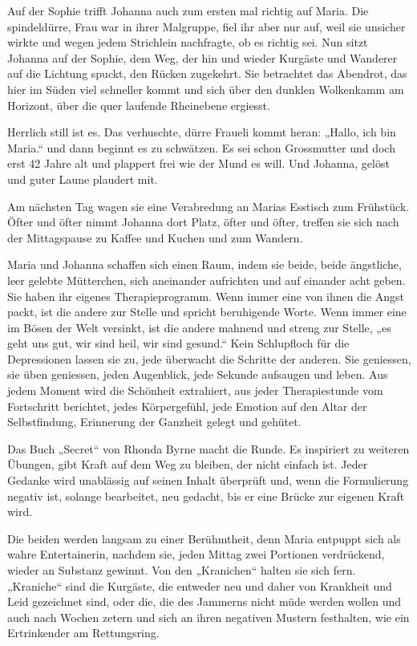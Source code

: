 \documentclass[10pt,titlepage,a5paper]{book}
\begin{document}
Auf der Sophie trifft Johanna auch zum ersten mal richtig auf Maria. Die spindeldürre, Frau war in ihrer Malgruppe, fiel ihr aber nur auf, weil sie unsicher wirkte und wegen jedem Strichlein nachfragte, ob es richtig sei. Nun sitzt Johanna auf der Sophie, dem Weg, der hin und wieder Kurgäste und Wanderer auf die Lichtung spuckt, den Rücken zugekehrt. Sie betrachtet das Abendrot, das hier im Süden viel schneller kommt und sich über den dunklen Wolkenkamm am Horizont, über die quer laufende Rheinebene ergiesst.

 Herrlich still ist es. Das verhuschte, dürre Fraueli kommt heran: „Hallo, ich bin Maria.“ und dann beginnt es zu schwätzen. Es sei schon Grossmutter und doch erst 42 Jahre alt und plappert frei wie der Mund es will. Und Johanna, gelöst und guter Laune plaudert mit. 
 
Am nächsten Tag wagen sie eine Verabredung an Marias Esstisch zum Frühstück. Öfter und öfter nimmt Johanna dort Platz, öfter und öfter, treffen sie sich nach der Mittagspause zu Kaffee und Kuchen und zum Wandern. 

Maria und Johanna schaffen sich einen Raum, indem sie beide, beide  ängstliche, leer gelebte Mütterchen, sich aneinander aufrichten und auf einander acht geben. Sie haben ihr eigenes Therapieprogramm. Wenn immer eine von ihnen die Angst packt, ist die andere zur Stelle und spricht beruhigende Worte. Wenn immer eine im Bösen der Welt versinkt, ist die andere mahnend und streng zur Stelle, „es geht uns gut, wir sind heil, wir sind gesund.“ Kein Schlupfloch für die Depressionen lassen sie zu, jede überwacht die Schritte der anderen. Sie geniessen, sie üben geniessen, jeden Augenblick, jede Sekunde aufsaugen und leben. Aus jedem Moment wird die Schönheit extrahiert, aus jeder Therapiestunde vom Fortschritt berichtet, jedes Körpergefühl, jede Emotion auf den Altar der Selbstfindung, Erinnerung der Ganzheit gelegt und gehütet.  

Das Buch „Secret“ von Rhonda Byrne macht die Runde. Es inspiriert zu weiteren Übungen, gibt Kraft auf dem Weg zu bleiben, der nicht einfach ist. Jeder Gedanke wird unablässig auf seinen Inhalt überprüft und, wenn die Formulierung negativ ist, solange bearbeitet, neu gedacht, bis er eine Brücke zur eigenen Kraft wird.

Die beiden werden langsam zu einer Berühmtheit, denn Maria entpuppt sich als wahre Entertainerin, nachdem sie, jeden Mittag zwei Portionen verdrückend, wieder an Substanz gewinnt. Von den „Kranichen“ halten sie sich fern. „Kraniche“ sind die Kurgäste, die entweder neu und daher von Krankheit und Leid gezeichnet sind, oder die, die des Jammerns nicht müde werden wollen und auch nach Wochen zetern und sich an ihren negativen Mustern festhalten, wie ein Ertrinkender am Rettungsring.
\end{document}
